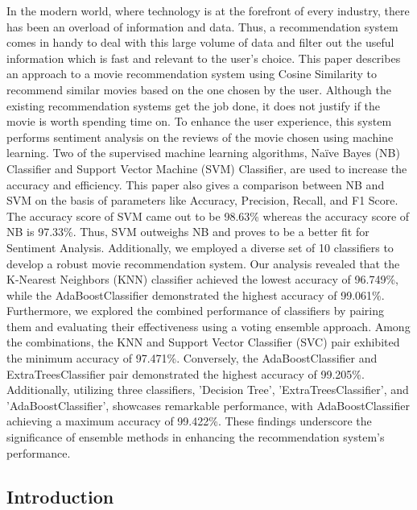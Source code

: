 \documentclass[
]{article}
\begin{document}
In the modern world, where technology is at the forefront of every
industry, there has been an overload of information and data. Thus, a
recommendation system comes in handy to deal with this large volume of
data and filter out the useful information which is fast and relevant to
the user's choice. This paper describes an approach to a movie
recommendation system using Cosine Similarity to recommend similar
movies based on the one chosen by the user. Although the existing
recommendation systems get the job done, it does not justify if the
movie is worth spending time on. To enhance the user experience, this
system performs sentiment analysis on the reviews of the movie chosen
using machine learning. Two of the supervised machine learning
algorithms, Naïve Bayes (NB) Classifier and Support Vector Machine (SVM)
Classifier, are used to increase the accuracy and efficiency. This paper
also gives a comparison between NB and SVM on the basis of parameters
like Accuracy, Precision, Recall, and F1 Score. The accuracy score of
SVM came out to be 98.63\% whereas the accuracy score of NB is 97.33\%.
Thus, SVM outweighs NB and proves to be a better fit for Sentiment
Analysis. Additionally, we employed a diverse set of 10 classifiers to
develop a robust movie recommendation system. Our analysis revealed that
the K-Nearest Neighbors (KNN) classifier achieved the lowest accuracy of
96.749\%, while the AdaBoostClassifier demonstrated the highest accuracy
of 99.061\%. Furthermore, we explored the combined performance of
classifiers by pairing them and evaluating their effectiveness using a
voting ensemble approach. Among the combinations, the KNN and Support
Vector Classifier (SVC) pair exhibited the minimum accuracy of 97.471\%.
Conversely, the AdaBoostClassifier and ExtraTreesClassifier pair
demonstrated the highest accuracy of 99.205\%. Additionally, utilizing
three classifiers, 'Decision Tree', 'ExtraTreesClassifier', and
'AdaBoostClassifier', showcases remarkable performance, with
AdaBoostClassifier achieving a maximum accuracy of 99.422\%. These
findings underscore the significance of ensemble methods in enhancing
the recommendation system's performance.

\hypertarget{introduction}{%
\subsection{Introduction}\label{introduction}}
\end{document}
